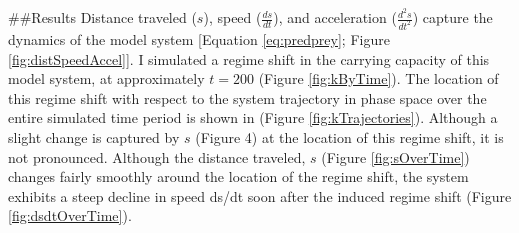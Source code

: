 \documentclass[print]{nuthesis}
\begin{document}
\#\#Results
Distance traveled (\(s\)), speed (\(\frac{ds}{dt}\)), and acceleration (\(\frac{d^2 s}{dt^2}\)) capture the dynamics of the model system {[}Equation \eqref{eq:predprey}; Figure \ref{fig:distSpeedAccel}{]}. I simulated a regime shift in the carrying capacity of this model system, at approximately \(t=200\) (Figure \ref{fig:kByTime}). The location of this regime shift with respect to the system trajectory in phase space over the entire simulated time period is shown in (Figure \ref{fig:kTrajectories}). Although a slight change is captured by \(s\) (Figure 4) at the location of this regime shift, it is not pronounced. Although the distance traveled, \(s\) (Figure \ref{fig:sOverTime}) changes fairly smoothly around the location of the regime shift, the system exhibits a steep decline in speed ds/dt soon after the induced regime shift (Figure \ref{fig:dsdtOverTime}).
\end{document}
